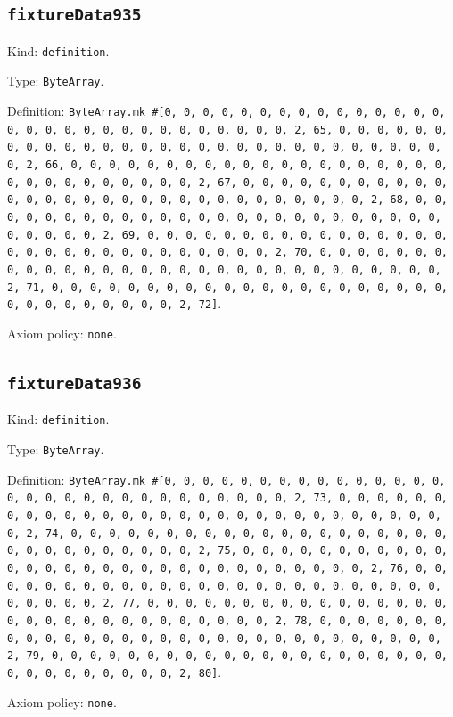 \documentclass[11pt]{article}
\begin{document}
\subsection*{\texttt{fixtureData935}}
\noindent Kind: \texttt{definition}.\par
\noindent Type: \texttt{ByteArray}.\par
\noindent Definition: \texttt{ByteArray.mk \#[0, 0, 0, 0, 0, 0, 0, 0, 0, 0, 0, 0, 0, 0, 0, 0, 0, 0, 0, 0, 0, 0, 0, 0, 0, 0, 0, 0, 0, 0, 2, 65, 0, 0, 0, 0, 0, 0, 0, 0, 0, 0, 0, 0, 0, 0, 0, 0, 0, 0, 0, 0, 0, 0, 0, 0, 0, 0, 0, 0, 0, 0, 2, 66, 0, 0, 0, 0, 0, 0, 0, 0, 0, 0, 0, 0, 0, 0, 0, 0, 0, 0, 0, 0, 0, 0, 0, 0, 0, 0, 0, 0, 0, 0, 2, 67, 0, 0, 0, 0, 0, 0, 0, 0, 0, 0, 0, 0, 0, 0, 0, 0, 0, 0, 0, 0, 0, 0, 0, 0, 0, 0, 0, 0, 0, 0, 2, 68, 0, 0, 0, 0, 0, 0, 0, 0, 0, 0, 0, 0, 0, 0, 0, 0, 0, 0, 0, 0, 0, 0, 0, 0, 0, 0, 0, 0, 0, 0, 2, 69, 0, 0, 0, 0, 0, 0, 0, 0, 0, 0, 0, 0, 0, 0, 0, 0, 0, 0, 0, 0, 0, 0, 0, 0, 0, 0, 0, 0, 0, 0, 2, 70, 0, 0, 0, 0, 0, 0, 0, 0, 0, 0, 0, 0, 0, 0, 0, 0, 0, 0, 0, 0, 0, 0, 0, 0, 0, 0, 0, 0, 0, 0, 2, 71, 0, 0, 0, 0, 0, 0, 0, 0, 0, 0, 0, 0, 0, 0, 0, 0, 0, 0, 0, 0, 0, 0, 0, 0, 0, 0, 0, 0, 0, 0, 2, 72]}.\par
\noindent Axiom policy: \texttt{none}.\par
\subsection*{\texttt{fixtureData936}}
\noindent Kind: \texttt{definition}.\par
\noindent Type: \texttt{ByteArray}.\par
\noindent Definition: \texttt{ByteArray.mk \#[0, 0, 0, 0, 0, 0, 0, 0, 0, 0, 0, 0, 0, 0, 0, 0, 0, 0, 0, 0, 0, 0, 0, 0, 0, 0, 0, 0, 0, 0, 2, 73, 0, 0, 0, 0, 0, 0, 0, 0, 0, 0, 0, 0, 0, 0, 0, 0, 0, 0, 0, 0, 0, 0, 0, 0, 0, 0, 0, 0, 0, 0, 2, 74, 0, 0, 0, 0, 0, 0, 0, 0, 0, 0, 0, 0, 0, 0, 0, 0, 0, 0, 0, 0, 0, 0, 0, 0, 0, 0, 0, 0, 0, 0, 2, 75, 0, 0, 0, 0, 0, 0, 0, 0, 0, 0, 0, 0, 0, 0, 0, 0, 0, 0, 0, 0, 0, 0, 0, 0, 0, 0, 0, 0, 0, 0, 2, 76, 0, 0, 0, 0, 0, 0, 0, 0, 0, 0, 0, 0, 0, 0, 0, 0, 0, 0, 0, 0, 0, 0, 0, 0, 0, 0, 0, 0, 0, 0, 2, 77, 0, 0, 0, 0, 0, 0, 0, 0, 0, 0, 0, 0, 0, 0, 0, 0, 0, 0, 0, 0, 0, 0, 0, 0, 0, 0, 0, 0, 0, 0, 2, 78, 0, 0, 0, 0, 0, 0, 0, 0, 0, 0, 0, 0, 0, 0, 0, 0, 0, 0, 0, 0, 0, 0, 0, 0, 0, 0, 0, 0, 0, 0, 2, 79, 0, 0, 0, 0, 0, 0, 0, 0, 0, 0, 0, 0, 0, 0, 0, 0, 0, 0, 0, 0, 0, 0, 0, 0, 0, 0, 0, 0, 0, 0, 2, 80]}.\par
\noindent Axiom policy: \texttt{none}.\par
\end{document}
